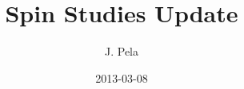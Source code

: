 \documentclass[8pt]{beamer}
\author[João Pela]{J. Pela}
\title[Spin Studies Update]{Spin Studies Update}
\institute{Imperial College London}
\date{2013-03-08}
\begin{document}
\setlength{\unitlength}{1mm}

\begin{frame}
  \titlepage
\end{frame}

% 
%     
% 
% 
% 
% 
%  
%  
% 
%  
%  
% 
%  
\end{document}
